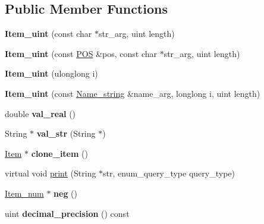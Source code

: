 \subsection*{Public Member Functions}
\begin{DoxyCompactItemize}
\item 
\mbox{\label{classItem__uint_afb05bbd5a38a139db8aa8c91123e5fac}} 
{\bfseries Item\+\_\+uint} (const char $\ast$str\+\_\+arg, uint length)
\item 
\mbox{\label{classItem__uint_aa43a6d2292a025268e493f04d8ad1279}} 
{\bfseries Item\+\_\+uint} (const \mbox{\hyperlink{structYYLTYPE}{P\+OS}} \&pos, const char $\ast$str\+\_\+arg, uint length)
\item 
\mbox{\label{classItem__uint_afdf9b17690d9a97200c4652c42c7236c}} 
{\bfseries Item\+\_\+uint} (ulonglong i)
\item 
\mbox{\label{classItem__uint_a487e56be11b887609facf3f121158eec}} 
{\bfseries Item\+\_\+uint} (const \mbox{\hyperlink{className__string}{Name\+\_\+string}} \&name\+\_\+arg, longlong i, uint length)
\item 
\mbox{\label{classItem__uint_a989fc3a9cf2a7279696e826e9c5de654}} 
double {\bfseries val\+\_\+real} ()
\item 
\mbox{\label{classItem__uint_a2aa29e4d48951bea83f30b6c1b5e9e76}} 
String $\ast$ {\bfseries val\+\_\+str} (String $\ast$)
\item 
\mbox{\label{classItem__uint_a8ca5bceb015b159c32ff3f53bb8be922}} 
\mbox{\hyperlink{classItem}{Item}} $\ast$ {\bfseries clone\+\_\+item} ()
\item 
virtual void \mbox{\hyperlink{classItem__uint_a24c54d4822268228386af4160895372c}{print}} (String $\ast$str, enum\+\_\+query\+\_\+type query\+\_\+type)
\item 
\mbox{\label{classItem__uint_ae4954aef1b5bcacab64b4f3de7cab2ba}} 
\mbox{\hyperlink{classItem__num}{Item\+\_\+num}} $\ast$ {\bfseries neg} ()
\item 
\mbox{\label{classItem__uint_a9a84dc96c449c84d92650c545c0e6606}} 
uint {\bfseries decimal\+\_\+precision} () const
\end{DoxyCompactItemize}
